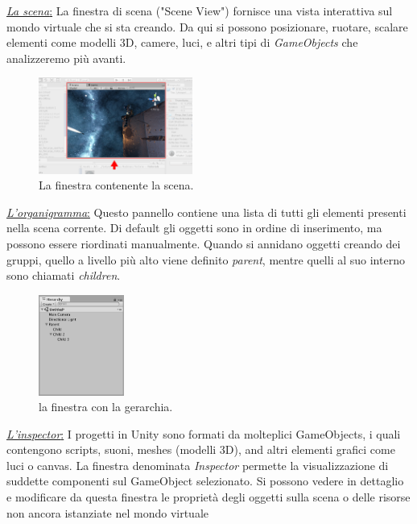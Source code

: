 \begin{flushleft}
	\underline{\textit{La scena}:}
	La finestra di scena ("Scene View") fornisce una vista interattiva sul mondo virtuale che si sta creando. Da qui si possono posizionare, ruotare, scalare elementi come modelli 3D, camere, luci, e altri tipi di \textit{GameObjects} che analizzeremo più avanti.
\end{flushleft}

\begin{figure}[H]
	\includegraphics[width=0.45\textwidth]{figure/Scene}
	\centering
	\caption{La finestra contenente la scena.}
\end{figure}


\begin{flushleft}
	\underline{\textit{L'organigramma}:}
	Questo pannello contiene una lista di tutti gli elementi presenti nella scena corrente. Di default gli oggetti sono in ordine di inserimento, ma possono essere riordinati manualmente. Quando si annidano oggetti creando dei gruppi, quello a livello più alto viene definito \textit{parent}, mentre quelli al suo interno sono chiamati \textit{children}. 
\end{flushleft}

\begin{figure}[H]
	\includegraphics[width=0.25\textwidth]{figure/Hierarchy}
	\centering
	\caption{la finestra con la gerarchia.}
\end{figure}

\begin{flushleft}
	\underline{\textit{L'inspector}:}
	I progetti in Unity sono formati da molteplici GameObjects, i quali contengono scripts, suoni, meshes (modelli 3D), and altri elementi grafici come luci o canvas. La finestra denominata \textit{Inspector} permette la visualizzazione di suddette componenti sul GameObject selezionato. Si possono vedere in dettaglio e modificare da questa finestra le proprietà degli oggetti sulla scena o delle risorse non ancora istanziate nel mondo virtuale
\end{flushleft}

